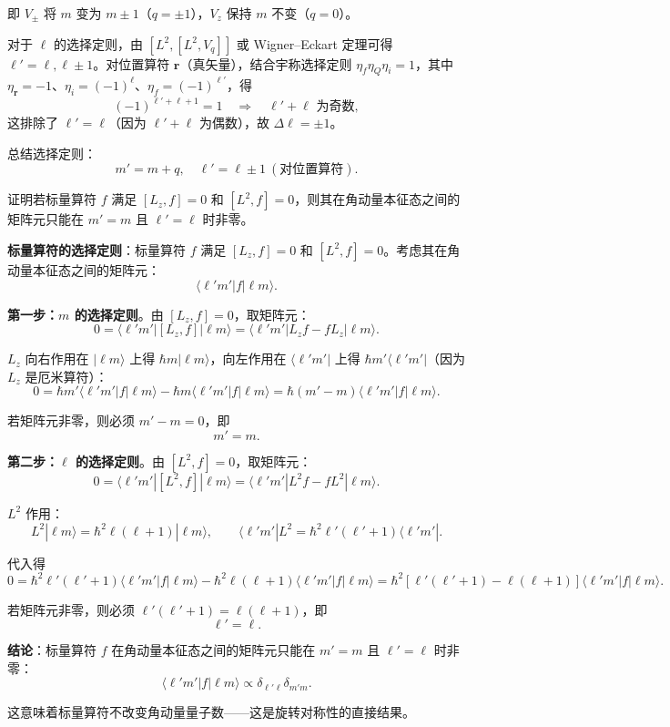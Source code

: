 \begin{solution}
	\noindent 即 $V_\pm$ 将 $m$ 变为 $m\pm1$（$q=\pm1$），$V_z$ 保持 $m$ 不变（$q=0$）。

	对于 $\ell$ 的选择定则，由 $[L^2,[L^2,V_q]]$ 或 Wigner--Eckart 定理可得 $\ell' = \ell,\ell\pm1$。对位置算符 $\mathbf r$（真矢量），结合宇称选择定则 $\eta_f\eta_Q\eta_i=1$，其中 $\eta_\mathbf r=-1$、$\eta_i=(-1)^\ell$、$\eta_f=(-1)^{\ell'}$，得
	\[
	(-1)^{\ell'+\ell+1}=1 \quad\Longrightarrow\quad \ell'+\ell \text{ 为奇数},
	\]
	这排除了 $\ell'=\ell$（因为 $\ell'+\ell$ 为偶数），故 $\Delta\ell = \pm1$。

	总结选择定则：
	\[
	\boxed{m' = m+q,\quad \ell' = \ell\pm1\ (\text{对位置算符})}.
	\]
	\end{solution}

\begin{question}
证明若标量算符 $f$ 满足 $[L_z,f]=0$ 和 $[L^2,f]=0$，则其在角动量本征态之间的矩阵元只能在 $m'=m$ 且 $\ell'=\ell$ 时非零。
\end{question}
\begin{solution}
	\textbf{标量算符的选择定则}：标量算符 $f$ 满足 $[L_z,f]=0$ 和 $[L^2,f]=0$。考虑其在角动量本征态之间的矩阵元：
	\[
	\langle \ell'm'|f|\ell m\rangle.
	\]

	\textbf{第一步：$m$ 的选择定则}。由 $[L_z,f]=0$，取矩阵元：
	\[
	0 = \langle \ell'm'|[L_z,f]|\ell m\rangle
	= \langle \ell'm'|L_z f - f L_z|\ell m\rangle.
	\]

	$L_z$ 向右作用在 $|\ell m\rangle$ 上得 $\hbar m|\ell m\rangle$，向左作用在 $\langle\ell'm'|$ 上得 $\hbar m'\langle\ell'm'|$（因为 $L_z$ 是厄米算符）：
	\[
	0 = \hbar m'\langle\ell'm'|f|\ell m\rangle - \hbar m\langle\ell'm'|f|\ell m\rangle
	= \hbar(m'-m)\langle\ell'm'|f|\ell m\rangle.
	\]

	若矩阵元非零，则必须 $m'-m=0$，即
	\[
	\boxed{m' = m}.
	\]

	\textbf{第二步：$\ell$ 的选择定则}。由 $[L^2,f]=0$，取矩阵元：
	\[
	0 = \langle \ell'm'|[L^2,f]|\ell m\rangle
	= \langle\ell'm'|L^2 f - f L^2|\ell m\rangle.
	\]

	$L^2$ 作用：
	\[
	L^2|\ell m\rangle = \hbar^2\ell(\ell+1)|\ell m\rangle,
	\qquad
	\langle\ell'm'|L^2 = \hbar^2\ell'(\ell'+1)\langle\ell'm'|.
	\]

	代入得
	\[
	0 = \hbar^2\ell'(\ell'+1)\langle\ell'm'|f|\ell m\rangle
	- \hbar^2\ell(\ell+1)\langle\ell'm'|f|\ell m\rangle
	= \hbar^2[\ell'(\ell'+1)-\ell(\ell+1)]\langle\ell'm'|f|\ell m\rangle.
	\]

	若矩阵元非零，则必须 $\ell'(\ell'+1)=\ell(\ell+1)$，即
	\[
	\boxed{\ell' = \ell}.
	\]

	\textbf{结论}：标量算符 $f$ 在角动量本征态之间的矩阵元只能在 $m'=m$ 且 $\ell'=\ell$ 时非零：
	\[
	\boxed{\langle \ell'm'|f|\ell m\rangle \propto \delta_{\ell'\ell}\delta_{m'm}}.
	\]

	这意味着标量算符不改变角动量量子数——这是旋转对称性的直接结果。
	\end{solution}

